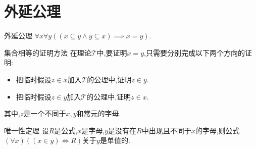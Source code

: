 \section{外延公理}

\begin{axiom}{外延公理}{}
	$\forall x\forall y\left(\left(x\subseteq y\wedge y\subseteq x\right)\implies x=y\right)$.
\end{axiom}

\begin{metatheorem}{集合相等的证明方法}{}
	在理论$\mathcal{T}$中,要证明$x=y$,只需要分别完成以下两个方向的证明:
	\begin{itemize}
		\item 把临时假设$z\in x$加入$\mathcal{T}$的公理中,证明$z\in y$.
		\item 把临时假设$z\in y$加入$\mathcal{T}$的公理中,证明$z\in x$. 
	\end{itemize}
	其中,$z$是一个不同于$x,y$和常元的字母.
\end{metatheorem}

\begin{metatheorem}{唯一性定理}{}
	设$R$是公式,$x$是字母,$y$是没有在$R$中出现且不同于$x$的字母,则公式$\left(\forall x\right)\left(\left(x\in y\right)\iff R\right)$关于$y$是单值的.
\end{metatheorem}